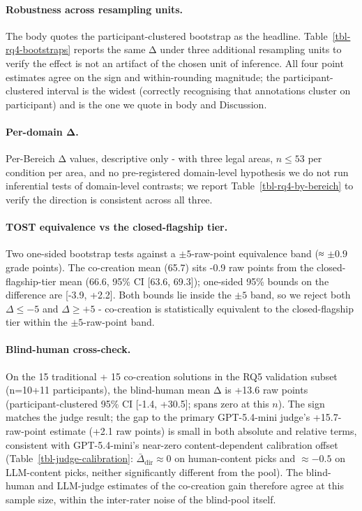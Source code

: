 \documentclass[11pt]{article}
\begin{document}
\paragraph{Robustness across resampling units.} The body quotes the
participant-clustered bootstrap as the headline.
Table~\ref{tbl-rq4-bootstraps} reports the same Δ under three additional
resampling units to verify the effect is not an artifact of the chosen
unit of inference. All four point estimates agree on the sign and
within-rounding magnitude; the participant-clustered interval is the
widest (correctly recognising that annotations cluster on participant)
and is the one we quote in body and Discussion.



\paragraph{Per-domain Δ.} Per-Bereich Δ values, descriptive only - with
three legal areas, \(n \leq 53\) per condition per area, and no
pre-registered domain-level hypothesis we do not run inferential tests
of domain-level contrasts; we report Table~\ref{tbl-rq4-by-bereich} to
verify the direction is consistent across all three.



\paragraph{TOST equivalence vs the closed-flagship tier.} Two one-sided
bootstrap tests against a \(\pm 5\)-raw-point equivalence band (≈
\(\pm 0.9\) grade points). The co-creation mean (65.7) sits -0.9 raw
points from the closed-flagship-tier mean (66.6, 95\% CI {[}63.6,
69.3{]}); one-sided 95\% bounds on the difference are {[}-3.9, +2.2{]}.
Both bounds lie inside the \(\pm 5\) band, so we reject both
\(\Delta \leq -5\) and \(\Delta \geq +5\) - co-creation is statistically
equivalent to the closed-flagship tier within the \(\pm 5\)-raw-point
band.

\paragraph{Blind-human cross-check.} On the 15 traditional + 15
co-creation solutions in the RQ5 validation subset (n=10+11
participants), the blind-human mean Δ is +13.6 raw points
(participant-clustered 95\% CI {[}-1.4, +30.5{]}; spans zero at this
\(n\)). The sign matches the judge result; the gap to the primary
GPT-5.4-mini judge's +15.7-raw-point estimate (+2.1 raw points) is small
in both absolute and relative terms, consistent with GPT-5.4-mini's
near-zero content-dependent calibration offset
(Table~\ref{tbl-judge-calibration}:
\(\bar{\Delta}_{\text{dir}} \approx 0\) on human-content picks and
\(\approx -0.5\) on LLM-content picks, neither significantly different
from the pool). The blind-human and LLM-judge estimates of the
co-creation gain therefore agree at this sample size, within the
inter-rater noise of the blind-pool itself.
\end{document}

